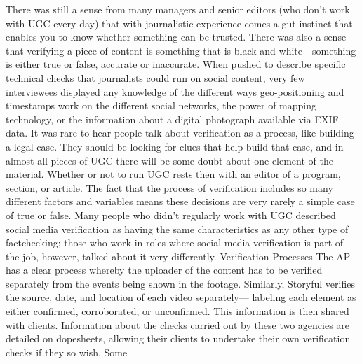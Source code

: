 \begin{enumerate}
There was still a sense from many managers and senior editors (who don't
work with UGC every day) that with journalistic experience comes a gut
instinct that enables you to know whether something can be trusted. There
was also a sense that verifying a piece of content is something that is black
and white—something is either true or false, accurate or inaccurate.
When pushed to describe specific technical checks that journalists could
run on social content, very few interviewees displayed any knowledge of the
different ways geo-positioning and timestamps work on the different social
networks, the power of mapping technology, or the information about a
digital photograph available via EXIF data.
It was rare to hear people talk about verification as a process, like building
a legal case. They should be looking for clues that help build that case, and
in almost all pieces of UGC there will be some doubt about one element of
the material. Whether or not to run UGC rests then with an editor of a program,
section, or article. The fact that the process of verification includes so
many different factors and variables means these decisions are very rarely a
simple case of true or false.
Many people who didn't regularly work with UGC described social media
verification as having the same characteristics as any other type of factchecking;
those who work in roles where social media verification is part of
the job, however, talked about it very differently.
Verification Processes
The AP has a clear process whereby the uploader of the content has to be
verified separately from the events being shown in the footage. Similarly,
Storyful verifies the source, date, and location of each video separately—
labeling each element as either confirmed, corroborated, or unconfirmed.
This information is then shared with clients. Information about the checks
carried out by these two agencies are detailed on dopesheets, allowing their
clients to undertake their own verification checks if they so wish. Some


\end{enumerate}
